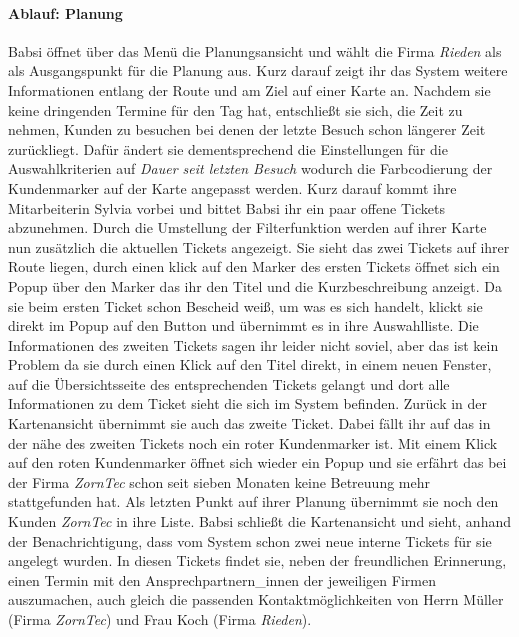 \documentclass[Bachelorarbeit.tex]{subfiles}
\begin{document}
\paragraph*{Ablauf: Planung}
Babsi öffnet über das Menü die Planungsansicht und wählt die Firma \textit{Rieden} als als Ausgangspunkt für die Planung aus.
Kurz darauf zeigt ihr das System weitere Informationen entlang der Route und am Ziel auf einer Karte an.
Nachdem sie keine dringenden Termine für den Tag hat, entschließt sie sich, die Zeit zu nehmen, Kunden zu besuchen bei denen der letzte Besuch schon längerer Zeit zurückliegt.
Dafür ändert sie dementsprechend die Einstellungen für die Auswahlkriterien auf \textit{Dauer seit letzten Besuch} wodurch die Farbcodierung der Kundenmarker auf der Karte angepasst werden.
Kurz darauf kommt ihre Mitarbeiterin Sylvia vorbei und bittet Babsi ihr ein paar offene Tickets abzunehmen. 
Durch die Umstellung der Filterfunktion werden auf ihrer Karte nun zusätzlich die aktuellen Tickets angezeigt.
Sie sieht das zwei Tickets auf ihrer Route liegen, durch einen klick auf den Marker des ersten Tickets öffnet sich ein Popup über den Marker das ihr den Titel und die Kurzbeschreibung anzeigt. 
Da sie beim ersten Ticket schon Bescheid weiß, um was es sich handelt, klickt sie direkt im Popup auf den Button und übernimmt es in ihre Auswahlliste.
Die Informationen des zweiten Tickets sagen ihr leider nicht soviel, aber das ist kein Problem da sie durch einen Klick auf den Titel direkt, in einem neuen Fenster, auf die Übersichtsseite des entsprechenden Tickets gelangt und dort alle Informationen zu dem Ticket sieht die sich im System befinden.
Zurück in der Kartenansicht übernimmt sie auch das zweite Ticket. 
Dabei fällt ihr auf das in der nähe des zweiten Tickets noch ein roter Kundenmarker ist.
Mit einem Klick auf den roten Kundenmarker öffnet sich wieder ein Popup und sie erfährt das bei der Firma \textit{ZornTec} schon seit sieben Monaten keine Betreuung mehr stattgefunden hat.
Als letzten Punkt auf ihrer Planung übernimmt sie noch den Kunden \textit{ZornTec} in ihre Liste. 
Babsi schließt die Kartenansicht und sieht, anhand der Benachrichtigung, dass vom System schon zwei neue interne Tickets für sie angelegt wurden.
In diesen Tickets findet sie, neben der freundlichen Erinnerung, einen Termin mit den Ansprechpartnern\_innen der jeweiligen Firmen auszumachen, auch gleich die passenden Kontaktmöglichkeiten von Herrn Müller (Firma \textit{ZornTec}) und Frau Koch (Firma \textit{Rieden}).
\end{document}
